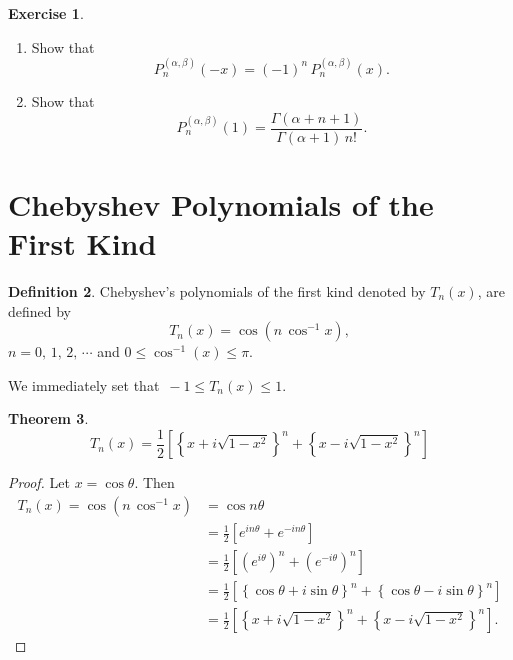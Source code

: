 \documentclass[12pt,a4paper]{report}
\theoremstyle{definition}
\newtheorem{thm}{Theorem}[section]
\newtheorem{defn}[thm]{Definition}
\newtheorem{exe}[thm]{Exercise}
\theoremstyle{plain}
\begin{document}
\begin{exe}\textbf{}
\begin{enumerate}
\item[(a).] Show that $$P_n^{(\alpha,\beta)}(-x) = (-1)^n\, P_n^{(\alpha,\beta)}(x).$$
\item[(b).] Show that $$P^{(\alpha,\beta)}_n(1) = \frac{\Gamma\left(\alpha + n + 1\right)}{\Gamma(\alpha + 1)\, n!}.$$
\end{enumerate}
\end{exe}



\section{Chebyshev Polynomials of the First Kind}
\begin{defn}
Chebyshev's polynomials of the first kind denoted by $T_n(x)$, are defined by $$T_n(x) = \cos \left(n\, \cos^{-1}x\right),$$ $n= 0,\, 1,\, 2,\, \cdots$ and $0\leq \cos^{-1}(x) \leq \pi$.
\end{defn}



We immediately set that $\, -1 \leq T_n(x) \leq 1$.


\begin{thm}
$$T_n(x) = \frac{1}{2}\left[\left\{x + i\sqrt{1 - x^2}\right\}^n + \left\{x - i\sqrt{1 - x^2}\right\}^n\right]$$
\end{thm}

\begin{proof}
Let $x = \cos \theta$. Then
\begin{align*}
T_n(x)  = \cos \left(n\, \cos^{-1}x\right) & = \cos n\theta\\
                                           & = \frac{1}{2}\left[e^{in\theta} + e^{-in\theta}\right]\\
                                           & = \frac{1}{2}\left[\left(e^{i\theta}\right)^n + \left(e^{-i\theta}\right)^n\right]\\
                                           & = \frac{1}{2}\left[\left\{\cos \theta + i\sin \theta\right\}^n + \left\{\cos \theta - i\sin \theta\right\}^n\right]\\
                                           & = \frac{1}{2}\left[\left\{x + i \sqrt{1 - x^2}\right\}^n + \left\{x - i\sqrt{1 - x^2}\right\}^n \right].
\end{align*}
\end{proof}
\end{document}

